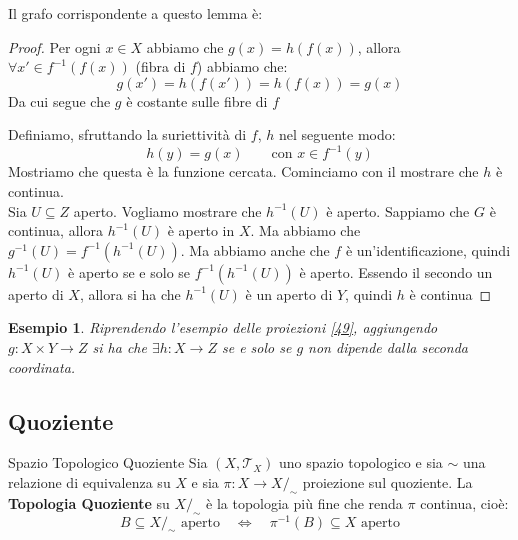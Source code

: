 \documentclass[11pt,a4paper,twoside]{article}
\newtheorem{es}{Esempio}
\theoremstyle{definition}
\begin{document}
Il grafo corrispondente a questo lemma è:

\begin{center}
\end{center}

\begin{proof}
	\fbox{$\Rightarrow$} Per ogni $x \in X$ abbiamo che $g(x) = h(f(x))$, allora $\forall x' \in f^{-1}(f(x))$ (fibra di $f$) abbiamo che:
	\[ g(x') = h(f(x')) = h(f(x)) =g(x) \]
	Da cui segue che $g$ è costante sulle fibre di $f$

	\fbox{$\Leftarrow$} Definiamo, sfruttando la suriettività di $f$, $h$ nel seguente modo:
	\[ h(y) = g(x) \qquad \text{con }x \in f^{-1}(y)\]
	Mostriamo che questa è la funzione cercata. Cominciamo con il mostrare che $h$ è continua.\\
	Sia $U \subseteq Z$ aperto. Vogliamo mostrare che $h^{-1}(U)$ è aperto. Sappiamo che $G$ è continua, allora $h^{-1}(U)$ è aperto in $X$. Ma abbiamo che $g^{-1}(U) = f^{-1}(h^{-1}(U))$. Ma abbiamo anche che $f$ è un'identificazione, quindi $h^{-1}(U)$ è aperto se e solo se $f^{-1}(h^{-1}(U))$ è aperto. Essendo il secondo un aperto di $X$, allora si ha che $h^{-1}(U)$ è un aperto di $Y$, quindi $h$ è continua
\end{proof}

\begin{es}
	Riprendendo l'esempio delle proiezioni \ref{49}, aggiungendo $g:X \times Y \to Z$ si ha che $\exists h:X \to Z$ se e solo se $g$ non dipende dalla seconda coordinata.
	\begin{center}
	\end{center}
\end{es}

\subsection{Quoziente}

\begin{defn}{Spazio Topologico Quoziente}{}
	Sia $(X, \mathcal T_X)$ uno spazio topologico e sia $\sim$ una relazione di equivalenza su $X$ e sia $\pi:X \to X/_\sim$ proiezione sul quoziente. La \textbf{Topologia Quoziente} su $X/_\sim$ è la topologia più fine che renda $\pi$ continua, cioè:
	\[ B \subseteq X/_\sim \text{ aperto} \quad \Leftrightarrow \quad \pi^{-1}(B)\subseteq X\text{ aperto} \]
\end{defn}
\end{document}

